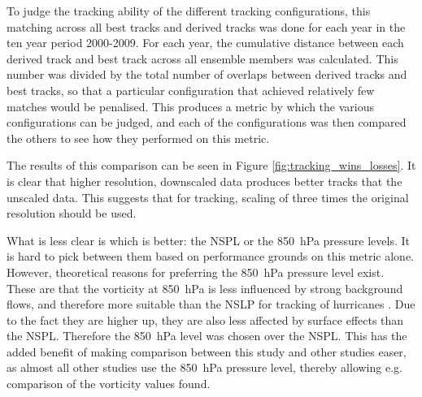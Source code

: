 \documentclass[pdftex,12pt,a4paper]{report}
\begin{document}
To judge the tracking ability of the different tracking configurations, this matching across all
best tracks and derived tracks was done for each year in the ten year period 2000-2009. For each
year, the cumulative distance between each derived track and best track across all ensemble members
was calculated. This number was divided by the total number of overlaps between derived tracks and
best tracks, so that a particular configuration that achieved relatively few matches would be
penalised. This produces a metric by which the various configurations can be judged, and each of
the configurations was then compared the others to see how they performed on this metric. 

The results of this comparison can be seen in Figure \ref{fig:tracking_wins_losses}. It is clear
that higher resolution, downscaled data produces better tracks that the unscaled data. This suggests
that for tracking, scaling of three times the original resolution should be used.

What is less clear is which is better: the NSPL or the \SI{850}{hPa} pressure levels. It is hard to
pick between them based on performance grounds on this metric alone. However, theoretical reasons
for preferring the \SI{850}{hPa} pressure level exist. These are that the vorticity at \SI{850}{hPa}
is less influenced by strong background flows, and therefore more suitable than the NSLP for
tracking of hurricanes \parencite{trigo2006climatology}. Due to the fact they are higher up, they are
also less affected by surface effects than the NSPL. Therefore the \SI{850}{hPa} level was chosen
over the NSPL. This has the added benefit of making comparison between this study and other studies
easer, as almost all other studies use the \SI{850}{hPa} pressure level, thereby allowing e.g.
comparison of the vorticity values found.
\end{document}
